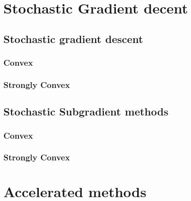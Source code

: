




\section{Stochastic Gradient decent}



\subsection{Stochastic gradient descent}
\subsubsection{Convex}


\subsubsection{Strongly Convex}
\cite{li2019convergence}

\subsection{Stochastic Subgradient methods}

\subsubsection{Convex}

\subsubsection{Strongly Convex}




\section{Accelerated methods}
